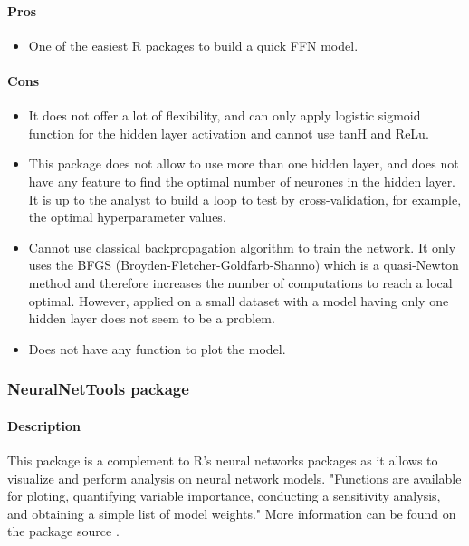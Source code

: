 \documentclass[letter,8pt]{article}\usepackage[]{graphicx}\usepackage[]{color}
\begin{document}
\paragraph{Pros}
\begin{itemize}
\item One of the easiest R packages to build a quick FFN model.
\end{itemize}
\paragraph{Cons}
\begin{itemize}
\item It does not offer a lot of flexibility, and can only apply logistic sigmoid function for the hidden layer activation and cannot use tanH and ReLu.
\item This package does not allow to use more than one hidden layer, and does not have any feature to find the optimal number of neurones in the hidden layer. It is up to the analyst to build a loop to test by cross-validation, for example, the optimal hyperparameter values.
\item Cannot use classical backpropagation algorithm to train the network. It only uses the BFGS (Broyden-Fletcher-Goldfarb-Shanno) which is a quasi-Newton method and therefore increases the number of computations to reach a local optimal. However, applied on a small dataset with a model having only one hidden layer does not seem to be a problem.
\item Does not have any function to plot the model.
\end{itemize}


\subsubsection{\textbf{NeuralNetTools package}}
\paragraph{Description}
This package is a complement to R's neural networks packages as it allows to visualize and perform analysis on neural network models. "Functions are available for ploting, quantifying variable importance, conducting a sensitivity analysis, and obtaining a simple list of model weights." More information can be found on the package source \cite{NeuralNetTools2018}.
\end{document}

